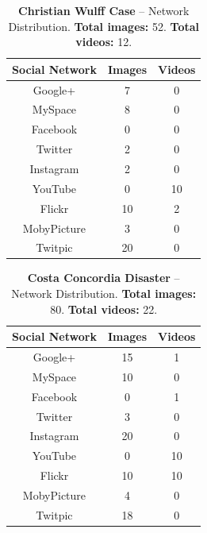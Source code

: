 \documentclass{acm_proc_article-sp}
\begin{document}
\begin{table}[htbp]
  \begin{tabular}{ | c | c | c | }
    \hline
    \textbf{Social Network} & \textbf{Images} & \textbf{Videos}\\
    \hline
    Google+ & 7 & 0\\
    MySpace & 8 & 0\\
    Facebook & 0 & 0\\
    Twitter & 2 & 0\\
    Instagram & 2 & 0\\
    YouTube & 0 & 10\\
    Flickr & 10 & 2\\
    MobyPicture & 3 & 0\\
    Twitpic & 20 & 0\\
    \hline
  \end{tabular}
  \label{tab:wulff}
  \caption{\textbf{Christian Wulff Case} -- Network Distribution. \textbf{Total images:} 52. \textbf{Total videos:} 12.}
\end{table}

\begin{table}[htbp]
  \begin{tabular}{ | c | c | c | }
    \hline
    \textbf{Social Network} & \textbf{Images} & \textbf{Videos}\\
    \hline
    Google+ & 15 & 1\\
    MySpace & 10 & 0\\
    Facebook & 0 & 1\\
    Twitter & 3 & 0\\
    Instagram & 20 & 0\\
    YouTube & 0 & 10\\
    Flickr & 10 & 10\\
    MobyPicture & 4 & 0\\
    Twitpic & 18 & 0\\
    \hline
  \end{tabular}
  \label{tab:concordia}
  \caption{\textbf{Costa Concordia Disaster} -- Network Distribution. \textbf{Total images:} 80. \textbf{Total videos:} 22.}
\end{table}
\end{document}
